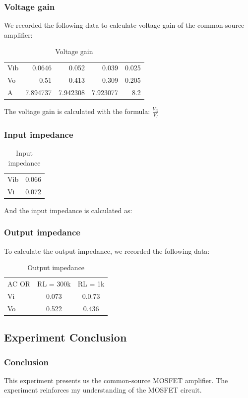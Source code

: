     \subsubsection{Voltage gain}
    We recorded the following data to calculate voltage gain of the common-source amplifier:
    \begin{table}[h]
        \centering
        \begin{tabular}{l|rrrr}
            Vib   & 0.0646 & 0.052 & 0.039 & 0.025 \\
            Vo    & 0.51  & 0.413 & 0.309 & 0.205 \\
            \midrule
            A     & 7.894737 & 7.942308 & 7.923077 & 8.2 \\
            \end{tabular}%
        \caption{Voltage gain}
    \end{table}
    The voltage gain is calculated with the formula: $\frac{V_O}{V_I}$

    \subsubsection{Input impedance}
    \begin{table}[h]
        \centering
    \begin{tabular}{lr}
        Vib   & 0.066 \\
        Vi    & 0.072 \\
        \end{tabular}%
        \caption{Input impedance}
    \end{table}
    And the input impedance is calculated as:
        
    \subsubsection{Output impedance}
    To calculate the output impedance, we recorded the following data:
    \begin{table}[h]
        \centering
    \begin{tabular}{lcc}
        AC OR & RL = 300k & RL = 1k \\
        Vi    & 0.073 & 0.0.73 \\
        Vo    & 0.522 & 0.436 \\
        \end{tabular}%
        \caption{Output impedance}
    \end{table}

\subsection{Experiment Conclusion}
    \subsubsection{Conclusion}
    This experiment presents us the common-source MOSFET amplifier. The experiment reinforces my understanding of the MOSFET circuit.\par